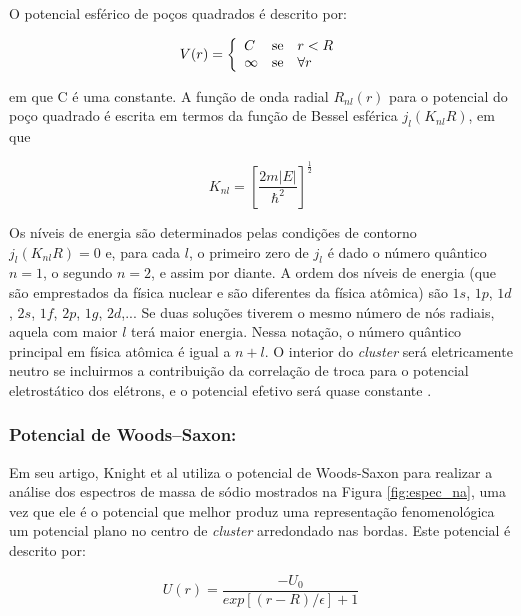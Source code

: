 O potencial esférico de poços quadrados é descrito por:



\begin{equation}
 V(r) = \left\{\begin{array}{lll}
C & \hbox{se} & r < R \\
\infty & \hbox{se}  & \forall r
\end{array}\right.
\end{equation}



\noindent
em que C é uma constante. A função de onda radial $R_{nl}(r)$ para o potencial do poço quadrado é escrita em termos da função de Bessel esférica $j_{l}(K_{nl}R)$, em que

\begin{equation}
    K_{nl}=\left[\frac{2m|E|}{\hbar^2}\right]^{\frac{1}{2}}
\end{equation}

Os níveis de energia são determinados pelas condições de contorno $j_{l}(K_{nl}R)=0$ e, para cada $l$, o primeiro zero de $j_l$ é dado o número quântico $n = 1$, o segundo $n = 2$, e assim por diante. A ordem dos níveis de energia (que são emprestados da física nuclear e são diferentes da física atômica) são $1s$, $1p$, $1d$, $2s$, $1f$, $2p$, $1g$, $2d$,... Se duas soluções tiverem o mesmo número de nós radiais, aquela com maior $l$ terá maior energia. Nessa notação, o número quântico principal em física atômica é igual a $n + l$. O interior do \textit{cluster} será eletricamente neutro se incluirmos a contribuição da correlação de troca para o potencial eletrostático dos elétrons, e o potencial efetivo será quase constante \cite{livro_cap16_Misra2012527}.


\subsubsection{Potencial de Woods–Saxon:}

Em seu artigo, Knight et al\cite{electronic_Shell_sodium} utiliza o potencial de Woods-Saxon para realizar a análise dos espectros de massa de sódio mostrados na Figura \ref{fig:espec_na}\cite{livro_cap16_Misra2012527}, uma vez que ele é o potencial que melhor produz uma representação fenomenológica um potencial plano no centro de \textit{cluster} arredondado nas bordas. Este potencial é descrito por:

\begin{equation}
    U(r)=\frac{-U_0}{exp[(r-R)/\epsilon]+1}
\end{equation}



